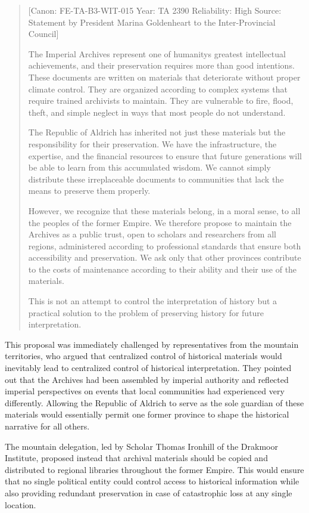 \begin{quote}
{[}Canon: FE-TA-B3-WIT-015 \textbar{} Year: TA 2390 \textbar{}
Reliability: High \textbar{} Source: Statement by President Marina
Goldenheart to the Inter-Provincial Council{]}

The Imperial Archives represent one of humanity\textquotesingle s
greatest intellectual achievements, and their preservation requires more
than good intentions. These documents are written on materials that
deteriorate without proper climate control. They are organized according
to complex systems that require trained archivists to maintain. They are
vulnerable to fire, flood, theft, and simple neglect in ways that most
people do not understand.

The Republic of Aldrich has inherited not just these materials but the
responsibility for their preservation. We have the infrastructure, the
expertise, and the financial resources to ensure that future generations
will be able to learn from this accumulated wisdom. We cannot simply
distribute these irreplaceable documents to communities that lack the
means to preserve them properly.

However, we recognize that these materials belong, in a moral sense, to
all the peoples of the former Empire. We therefore propose to maintain
the Archives as a public trust, open to scholars and researchers from
all regions, administered according to professional standards that
ensure both accessibility and preservation. We ask only that other
provinces contribute to the costs of maintenance according to their
ability and their use of the materials.

This is not an attempt to control the interpretation of history but a
practical solution to the problem of preserving history for future
interpretation.
\end{quote}

This proposal was immediately challenged by representatives from the
mountain territories, who argued that centralized control of historical
materials would inevitably lead to centralized control of historical
interpretation. They pointed out that the Archives had been assembled by
imperial authority and reflected imperial perspectives on events that
local communities had experienced very differently. Allowing the
Republic of Aldrich to serve as the sole guardian of these materials
would essentially permit one former province to shape the historical
narrative for all others.

The mountain delegation, led by Scholar Thomas Ironhill of the Drakmoor
Institute, proposed instead that archival materials should be copied and
distributed to regional libraries throughout the former Empire. This
would ensure that no single political entity could control access to
historical information while also providing redundant preservation in
case of catastrophic loss at any single location.

